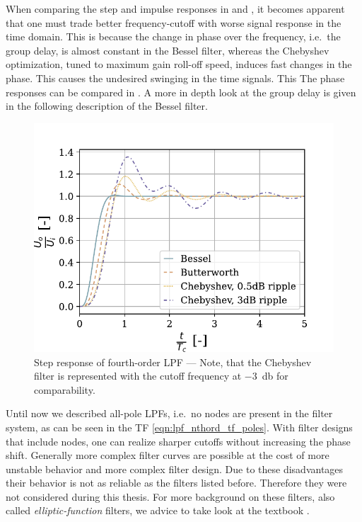 When comparing the step and impulse responses in  and , it becomes apparent that one must trade better frequency-cutoff with worse signal response in the time domain. This is because the change in phase over the frequency, i.e.\ the group delay, is almost constant in the Bessel filter, whereas the Chebyshev optimization, tuned to maximum gain roll-off speed, induces fast changes in the phase. This causes the undesired swinging in the time signals. This The phase responses can be compared in . A more in depth look at the group delay is given in the following description of the Bessel filter.

\begin{figure}[!htb]
  \centering
  \includegraphics[scale=0.68]{figures/electronics/lowpass/lp_filter_4ord_step}
  \caption[Step response of fourth-order \ac{LPF}]{Step response of fourth-order \ac{LPF} --- Note, that the Chebyshev filter is represented with the cutoff frequency at \SI{-3}{\decibel} for comparability.%
    \label{fig:lp_filter_4ord_step}}
\end{figure}

Until now we described all-pole \ac{LPF}s, i.e.\ no nodes are present in the filter system, as can be seen in the \ac{TF} \eqref{eqn:lpf_nthord_tf_poles}. With filter designs that include nodes, one can realize sharper cutoffs without increasing the phase shift. Generally more complex filter curves are possible at the cost of more unstable behavior and more complex filter design. Due to these disadvantages their behavior is not as reliable as the filters listed before. Therefore they were not considered during this thesis. For more background on these filters, also called \emph{elliptic-function} filters, we advice to take look at the textbook \cite{williams2014analog}.

